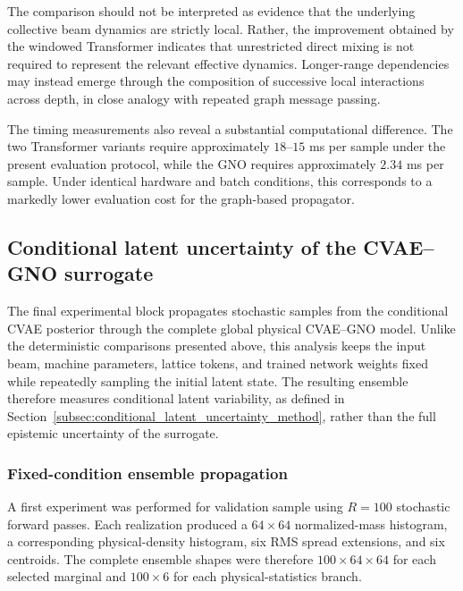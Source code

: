 The comparison should not be interpreted as evidence that the underlying collective beam dynamics are strictly local. Rather, the improvement obtained by the windowed Transformer indicates that unrestricted direct mixing is not required to represent the relevant effective dynamics. Longer-range dependencies may instead emerge through the composition of successive local interactions across depth, in close analogy with repeated graph message passing.

The timing measurements also reveal a substantial computational difference. The two Transformer variants require approximately $18$--$15$ ms per sample under the present evaluation protocol, while the GNO requires approximately $2.34$ ms per sample. Under identical hardware and batch conditions, this corresponds to a markedly lower evaluation cost for the graph-based propagator.


\subsection{Conditional latent uncertainty of the CVAE--GNO surrogate}
\label{subsec:results_conditional_latent_uncertainty}

The final experimental block propagates stochastic samples from the conditional CVAE posterior through the complete global physical CVAE--GNO model. Unlike the deterministic comparisons presented above, this analysis keeps the input beam, machine parameters, lattice tokens, and trained network weights fixed while repeatedly sampling the initial latent state. The resulting ensemble therefore measures conditional latent variability, as defined in Section~\ref{subsec:conditional_latent_uncertainty_method}, rather than the full epistemic uncertainty of the surrogate.

\subsubsection{Fixed-condition ensemble propagation}    
\label{subsubsec:uq_fixed_condition}

A first experiment was performed for validation sample
using $R=100$ stochastic forward passes. Each realization produced a \(64\times64\) normalized-mass histogram, a corresponding physical-density histogram, six RMS spread extensions, and six centroids. The complete ensemble shapes were therefore $100\times64\times64$ for each selected marginal and $100\times6$ for each physical-statistics branch.

